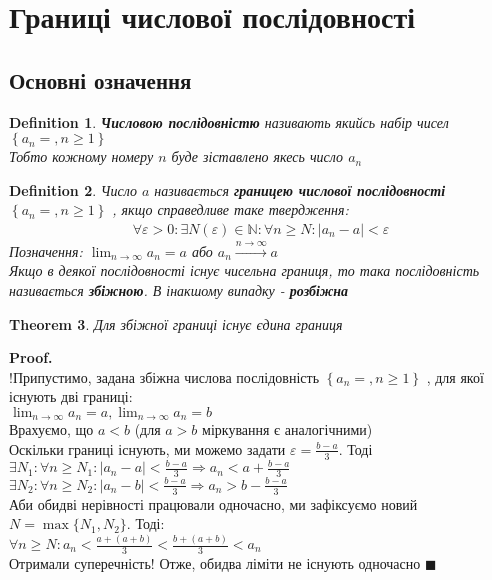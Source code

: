 \documentclass[a4paper, 14pt]{extarticle}
\def\huge{\displaystyle}
\newcommand{\sequence}[2][{}]{%
\ifthenelse{\equal{#1}{}}{$\{{#2}, n \geq 1 \}$}
{$\huge \left\{ {#2} = {#1}, n \geq 1 \right\}$}%
}
\theoremstyle{theoremdd}
\newtheorem{theorem}{Theorem}[subsection]
\theoremstyle{theoremdd}
\newtheorem{definition}[theorem]{Definition}
\theoremstyle{theoremdd}
\theoremstyle{theoremdd}
\theoremstyle{theoremdd}
\theoremstyle{theoremdd}
\theoremstyle{theoremdd}
\theoremstyle{theoremdd}
\newenvironment{pf}{\vspace*{-3mm} \textbf{Proof. \\}}{$\blacksquare$}
\begin{document}
	\section{Границі числової послідовності}
	\subsection{Основні означення}
	\begin{definition}
	\textbf{Числовою послідовністю} називають якийсь набір чисел \sequence{a_n}\\
	Тобто кожному номеру $n$ буде зіставлено якесь число $a_n$
	\end{definition}

	\begin{definition}
	Число $a$ називається \textbf{границею числової послідовності} \sequence{a_n}, якщо справедливе таке твердження:
	\begin{align*}
	\forall \varepsilon > 0: \exists N(\varepsilon) \in \mathbb{N}: \forall n \geq N: |a_n - a| < \varepsilon
	\end{align*}
	Позначення: $\displaystyle \lim_{n \to \infty} a_n = a$ або $a_n \overset{n \to \infty}{\longrightarrow} a$\\
	Якщо в деякої послідовності існує чисельна границя, то така послідовність називається \textbf{збіжною}. В інакшому випадку - \textbf{розбіжна}
	\end{definition}
	
	\begin{theorem}
	Для збіжної границі існує єдина границя
	\end{theorem}
	
	\begin{pf}
	!Припустимо, задана збіжна числова послідовність \sequence{a_n}, для якої існують дві границі:\\
	$\displaystyle \lim_{n \to \infty} a_n = a, \lim_{n \to \infty} a_n = b$\\
	Врахуємо, що $a<b$ (для $a>b$ міркування є аналогічними)\\
	Оскільки границі існують, ми можемо задати $\displaystyle \varepsilon = \frac{b-a}{3}$. Тоді\\
	$\displaystyle \exists N_1: \forall n \geq N_1: |a_n-a|< \frac{b-a}{3} \Rightarrow a_n < a + \frac{b-a}{3}$\\
	$\displaystyle \exists N_2: \forall n \geq N_2: |a_n-b|< \frac{b-a}{3} \Rightarrow a_n > b - \frac{b-a}{3}$\\
	Аби обидві нерівності працювали одночасно, ми зафіксуємо новий \\ $N= \max\{N_1,N_2\}$. Тоді:\\
	$\displaystyle \forall n \geq N: a_n < \frac{a+(a+b)}{3} < \frac{b+(a+b)}{3}<a_n$\\
	Отримали суперечність! Отже, обидва ліміти не існують одночасно
	\end{pf}
	
\end{document}
